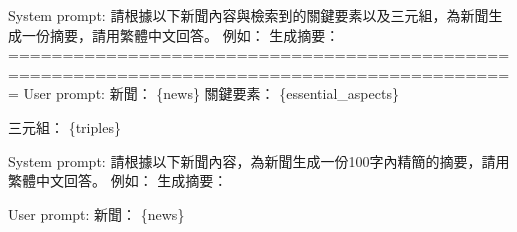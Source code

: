 \vspace{3mm} %
\noindent
\begin{tcolorbox}[promptstyle, title={Prompt for generating V2 summary}]
System prompt:\newline
請根據以下新聞內容與檢索到的關鍵要素以及三元組，為新聞生成一份摘要，請用繁體中文回答。\newline
例如：\newline
生成摘要：\newline
=============================================================================================\newline
User prompt:\newline
新聞：\newline
\{news\}\newline
\newline
關鍵要素：\newline
\{essential\_aspects\}\newline

三元組：\newline
\{triples\}
\end{tcolorbox}

\vspace{3mm}
\noindent
\begin{tcolorbox}[promptstyle, title={Prompt for generating V3 summary}]
System prompt:\newline
請根據以下新聞內容，為新聞生成一份100字內精簡的摘要，請用繁體中文回答。\newline
例如：\newline
生成摘要：\newline

User prompt:\newline
新聞：\newline
\{news\}
\end{tcolorbox}

